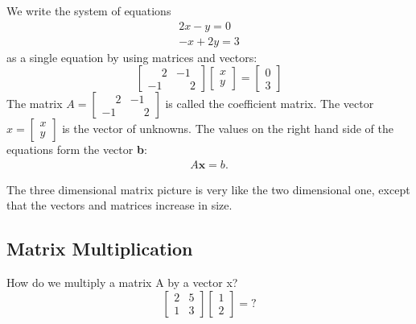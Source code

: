 \documentclass{ximera}
\begin{document}
We write the system of equations
\begin{align*}
2x-y = 0\\
-x+2y = 3
\end{align*}
as a single equation by using matrices and vectors:
\[
\begin{bmatrix} \phantom{-}2 & -1\\ -1 & \phantom{-}2 \end{bmatrix} \begin{bmatrix} 
  x\\y \end{bmatrix} =  \begin{bmatrix} 0\\3 \end{bmatrix}
\]
The matrix $A = \begin{bmatrix} \phantom{-}2 & -1\\-1 & \phantom{-}2 \end{bmatrix}$ 
is called the coefficient matrix. The vector $x = \begin{bmatrix} x\\y \end{bmatrix}$ 
is the vector of unknowns. The values on the right hand side of the equations form the 
vector \textbf{b}:
\begin{align*}
A\mathbf{x} = b.
\end{align*}

The three dimensional matrix picture is very like the two dimensional one, except 
that the vectors and matrices increase in size.

\subsection*{Matrix Multiplication}
How do we multiply a matrix A by a vector x?\\

\[\begin{bmatrix} 2 & 5\\ 1 & 3 \end{bmatrix} \begin{bmatrix} 1\\2 \end{bmatrix} = ?\]\\
\end{document}

